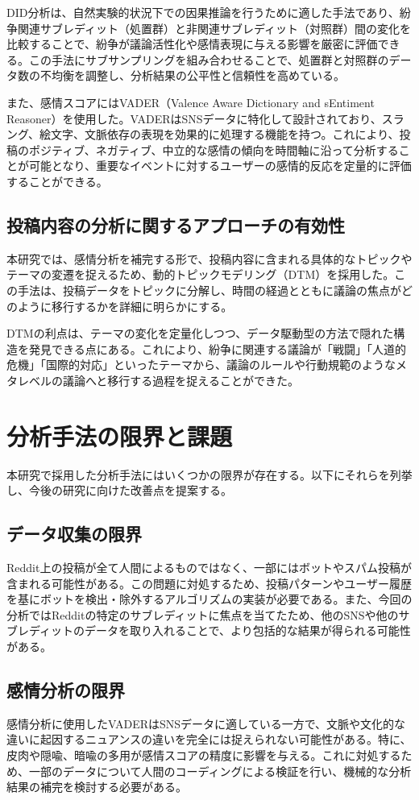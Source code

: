 \documentclass[11pt, a4j]{jreport}
\begin{document}
    DID分析は、自然実験的状況下での因果推論を行うために適した手法であり、紛争関連サブレディット（処置群）と非関連サブレディット（対照群）間の変化を比較することで、紛争が議論活性化や感情表現に与える影響を厳密に評価できる。この手法にサブサンプリングを組み合わせることで、処置群と対照群のデータ数の不均衡を調整し、分析結果の公平性と信頼性を高めている。

    また、感情スコアにはVADER（Valence Aware Dictionary and sEntiment Reasoner）を使用した。VADERはSNSデータに特化して設計されており、スラング、絵文字、文脈依存の表現を効果的に処理する機能を持つ。これにより、投稿のポジティブ、ネガティブ、中立的な感情の傾向を時間軸に沿って分析することが可能となり、重要なイベントに対するユーザーの感情的反応を定量的に評価することができる。

    \subsection{投稿内容の分析に関するアプローチの有効性}
    本研究では、感情分析を補完する形で、投稿内容に含まれる具体的なトピックやテーマの変遷を捉えるため、動的トピックモデリング（DTM）を採用した。この手法は、投稿データをトピックに分解し、時間の経過とともに議論の焦点がどのように移行するかを詳細に明らかにする。

    DTMの利点は、テーマの変化を定量化しつつ、データ駆動型の方法で隠れた構造を発見できる点にある。これにより、紛争に関連する議論が「戦闘」「人道的危機」「国際的対応」といったテーマから、議論のルールや行動規範のようなメタレベルの議論へと移行する過程を捉えることができた。

    \section{分析手法の限界と課題}
    本研究で採用した分析手法にはいくつかの限界が存在する。以下にそれらを列挙し、今後の研究に向けた改善点を提案する。

    \subsection{データ収集の限界}
    Reddit上の投稿が全て人間によるものではなく、一部にはボットやスパム投稿が含まれる可能性がある。この問題に対処するため、投稿パターンやユーザー履歴を基にボットを検出・除外するアルゴリズムの実装が必要である。また、今回の分析ではRedditの特定のサブレディットに焦点を当てたため、他のSNSや他のサブレディットのデータを取り入れることで、より包括的な結果が得られる可能性がある。

    \subsection{感情分析の限界}
    感情分析に使用したVADERはSNSデータに適している一方で、文脈や文化的な違いに起因するニュアンスの違いを完全には捉えられない可能性がある。特に、皮肉や隠喩、暗喩の多用が感情スコアの精度に影響を与える。これに対処するため、一部のデータについて人間のコーディングによる検証を行い、機械的な分析結果の補完を検討する必要がある。
\end{document}
